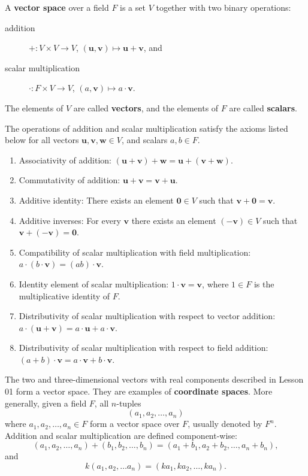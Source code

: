 \documentclass[a4paper,12pt]{amsart}
\begin{document}
    A \textbf{vector space} over a field $F$ is a set $V$ together with two binary operations: 
    
    \begin{description}
        \item[addition] $+: V \times V \to V$, $(\mathbf{u}, \mathbf{v}) \mapsto \mathbf{u} + \mathbf{v}$, and
        \item[scalar multiplication] $\cdot: F \times V \to V$, $(a, \mathbf{v}) \mapsto a \cdot \mathbf{v}$.
    \end{description} 

    The elements of $V$ are called \textbf{vectors}, and the elements of $F$ are called \textbf{scalars}.

    The operations of addition and scalar multiplication satisfy the axioms listed below for all vectors $\mathbf{u}, \mathbf{v}, \mathbf{w} \in V$, and scalars $a, b \in F$.

    \begin{enumerate}
        \item Associativity of addition: $(\mathbf{u} + \mathbf{v}) + \mathbf{w} = \mathbf{u} + (\mathbf{v} + \mathbf{w})$.
        \item Commutativity of addition: $\mathbf{u} + \mathbf{v} = \mathbf{v} + \mathbf{u}$.
        \item Additive identity: There exists an element $\mathbf{0} \in V$ such that $\mathbf{v} + \mathbf{0} = \mathbf{v}$.
        \item Additive inverses: For every $\mathbf{v}$ there exists an element $(-\mathbf{v}) \in V$ such that $\mathbf{v} + (-\mathbf{v}) = \mathbf{0}$.
        \item Compatibility of scalar multiplication with field multiplication: $a \cdot (b \cdot \mathbf{v}) = (ab) \cdot \mathbf{v}$.
        \item Identity element of scalar multiplication: $1 \cdot \mathbf{v} = \mathbf{v}$, where $1 \in F$ is the multiplicative identity of $F$.
        \item Distributivity of scalar multiplication with respect to vector addition: $a \cdot (\mathbf{u} + \mathbf{v}) = a \cdot \mathbf{u} + a \cdot \mathbf{v}$.
        \item Distributivity of scalar multiplication with respect to field addition: $(a + b) \cdot \mathbf{v} = a \cdot \mathbf{v} + b \cdot \mathbf{v}$.
    \end{enumerate}

    The two and three-dimensional vectors with real components described in Lesson 01 form a vector space. They are examples of \textbf{coordinate spaces}. More generally, given a field $F$, all $n$-tuples
    \[ (a_1, a_2, \ldots, a_n) \]
    where $a_1, a_2, \ldots, a_n \in F$ form a vector space over $F$, usually denoted by $F^n$. Addition and scalar multiplication are defined component-wise:
    \[ (a_1, a_2, \ldots, a_n) + (b_1, b_2, \ldots, b_n) = (a_1 + b_1, a_2 + b_2, \ldots, a_n + b_n), \]
    and
    \[ k (a_1, a_2, \ldots a_n ) = (k a_1, k a_2, \ldots, k a_n). \]
\end{document}
